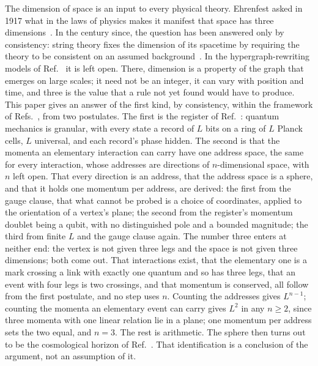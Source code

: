 \documentclass[aps,prd,twocolumn,superscriptaddress,nofootinbib]{revtex4-2}
\begin{document}
The dimension of space is an input to every physical theory. Ehrenfest asked in 1917 what in the laws of physics makes it manifest that space has three dimensions~\cite{ehrenfest1917}. In the century since, the question has been answered only by consistency: string theory fixes the dimension of its spacetime by requiring the theory to be consistent on an assumed background~\cite{lovelace1971,goddard1972}. In the hypergraph-rewriting models of Ref.~\cite{wolfram2020} it is left open. There, dimension is a property of the graph that emerges on large scales; it need not be an integer, it can vary with position and time, and three is the value that a rule not yet found would have to produce. This paper gives an answer of the first kind, by consistency, within the framework of Refs.~\cite{korytko2026,korytko2026b,korytko2026c}, from two postulates. The first is the register of Ref.~\cite{korytko2026c}: quantum mechanics is granular, with every state a record of $L$ bits on a ring of $L$ Planck cells, $L$ universal, and each record's phase hidden. The second is that the momenta an elementary interaction can carry have one address space, the same for every interaction, whose addresses are directions of $n$-dimensional space, with $n$ left open. That every direction is an address, that the address space is a sphere, and that it holds one momentum per address, are derived: the first from the gauge clause, that what cannot be probed is a choice of coordinates, applied to the orientation of a vertex's plane; the second from the register's momentum doublet being a qubit, with no distinguished pole and a bounded magnitude; the third from finite $L$ and the gauge clause again. The number three enters at neither end: the vertex is not given three legs and the space is not given three dimensions; both come out. That interactions exist, that the elementary one is a mark crossing a link with exactly one quantum and so has three legs, that an event with four legs is two crossings, and that momentum is conserved, all follow from the first postulate, and no step uses $n$. Counting the addresses gives $L^{n-1}$; counting the momenta an elementary event can carry gives $L^2$ in any $n \ge 2$, since three momenta with one linear relation lie in a plane; one momentum per address sets the two equal, and $n = 3$. The rest is arithmetic. The sphere then turns out to be the cosmological horizon of Ref.~\cite{korytko2026}. That identification is a conclusion of the argument, not an assumption of it.
\end{document}

